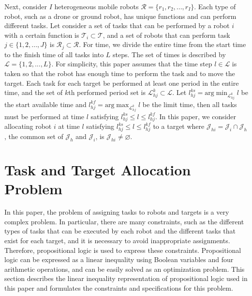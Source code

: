 \documentclass[]{interact}
\theoremstyle{plain}%
\theoremstyle{definition}
\theoremstyle{remark}
\begin{document}
Next, consider $I$ heterogeneous mobile robots $\mathcal{R}=\{r_1,r_2,...,r_I\}$.
Each type of robot, such as a drone or ground robot, has unique functions and can perform different tasks.
Let consider a set of tasks that can be performed by a robot $i$ with a certain function is $\mathcal{T}_i\subset\mathcal{T}$, and a set of robots that can perform task $j\in\{1,2,...,J\}$ is $\mathcal{R}_j\subset\mathcal{R}$. 
For time, we divide the entire time from the start time to the finish time of all tasks into $L$ steps. 
The set of times is described by $\mathcal{L}=\{1,2,...,L\}$.
For simplicity, this paper assumes that the time step $l\in\mathcal{L}$ is taken so that the robot has enough time to perform the task and to move the target.
Each task for each target be performed at least one period in the entire time, and the set of $k$th performed period set is $\mathcal{L}^k_{hj}\subset\mathcal{L}$. 
Let $l^{ks}_{hj} = \mathrm{arg}\min_{\mathcal{L}^k_{hj}} l$ be the start available time and $l^{kf}_{hj} = \mathrm{arg}\max_{\mathcal{L}^k_{hj}} l$ be the limit time, then all tasks must be performed at time $l$ satisfying $l^{ks}_{hj} \le l \le l^{kf}_{hj}$.
In this paper, we consider allocating robot $i$ at time $l$ satisfying $l^{ks}_{hj} \le l \le l^{kf}_{hj}$ to a target where $\mathcal{J}_{hi}=\mathcal{J}_{i}\cap\mathcal{J}_{h}$, the common set of $\mathcal{J}_h$ and $\mathcal{J}_i$, is $\mathcal{J}_{hi}\neq \varnothing$.

\section{Task and Target Allocation Problem}
In this paper, the problem of assigning tasks to robots and targets is a very complex problem. 
In particular, there are many constraints, such as the different types of tasks that can be executed by each robot and the different tasks that exist for each target, and it is necessary to avoid inappropriate assignments.
Therefore, propositional logic is used to express these constraints. 
Propositional logic can be expressed as a linear inequality using Boolean variables and four arithmetic operations, and can be easily solved as an optimization problem. 
This section describes the linear inequality representation of propositional logic used in this paper and formulates the constraints and specifications for this problem.
\end{document}
